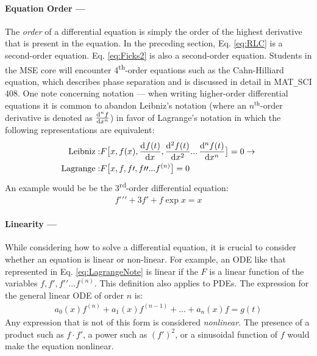 			\paragraph{Equation Order ---} The \emph{order} of a differential equation is simply the order of the highest derivative that is present in the equation. In the preceding section, Eq. \ref{eq:RLC} is a second-order equation. Eq. \ref{eq:Ficks2} is also a second-order equation. Students in the MSE core will encounter 4\textsuperscript{th}-order equations such as the Cahn-Hilliard equation, which describes phase separation and is discussed in detail in MAT\texttt{\_}SCI 408. One note concerning notation --- when writing higher-order differential equations it is common to abandon Leibniz's notation (where an $n^{\text{th}}$-order derivative is denoted as $\mathop{}\!\frac{\mathrm{d}^{n}{f}}{\mathrm{d}{x}^{n}}$) in favor of Lagrange's notation in which the following representations are equivalent:
%
\begin{align}
	\text{Leibniz}:& F\big[x,f(x),\mathop{}\!\frac{\mathrm{d}^{}{f(t)}}{\mathrm{d}{x}^{}},\mathop{}\!\frac{\mathrm{d}^{2}{f(t)}}{\mathrm{d}{x}^{2}}...\mathop{}\!\frac{\mathrm{d}^{n}{f(t)}}{\mathrm{d}{x}^{n}}\big] = 0 \rightarrow\\
	\text{Lagrange}:& F\big[x,f,f\prime,f\prime\prime...f^{(n)}\big] = 0 \label{eq:LagrangeNote}
\end{align}
%
An example would be be the 3\textsuperscript{rd}-order differential equation:
%
\begin{align}
	f\prime\prime\prime + 3f\prime + f\exp{x} = x
\end{align}
%			
%			
			\paragraph{Linearity ---} While considering how to solve a differential equation, it is crucial to consider whether an equation is linear or non-linear. For example, an ODE like that represented in Eq. \ref{eq:LagrangeNote} is linear if the $F$ is a linear function of the variables $f, f', f\prime\prime...f^{(n)}$. This definition also applies to PDEs. The  expression for the general linear ODE of order $n$ is:
%						
\begin{align}
	a_0(x)f^{(n)}+a_1(x)f^{(n-1)} + ... + a_n(x)f = g(t) \label{eq:LinearODE}
\end{align}
%			
Any expression that is not of this form	is considered \textit{nonlinear}. The presence of a product such as $f\cdot f\prime$, a power such as $(f\prime)^2$, or a sinusoidal function of $f$ would make the equation nonlinear.

